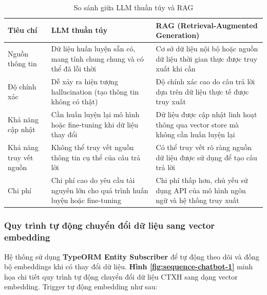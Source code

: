 \begin{table}[H]
\centering

\label{tab:compare-llm-rag}
\renewcommand{\arraystretch}{1.4}
\begin{tabular}{|p{}|p{}|p{}|}
\hline
\textbf{Tiêu chí} & \textbf{LLM thuần túy} & \textbf{RAG (Retrieval-Augmented Generation)} \\ 
\hline
Nguồn thông tin &
Dữ liệu huấn luyện sẵn có, mang tính chung chung và có thể đã lỗi thời &
Cơ sở dữ liệu nội bộ hoặc nguồn dữ liệu thời gian thực được truy xuất khi cần \\ 
\hline
Độ chính xác &
Dễ xảy ra hiện tượng hallucination (tạo thông tin không có thật) &
Độ chính xác cao do câu trả lời dựa trên dữ liệu thực tế được truy xuất \\ 
\hline
Khả năng cập nhật &
Cần huấn luyện lại mô hình hoặc fine-tuning khi dữ liệu thay đổi &
Dữ liệu được cập nhật linh hoạt thông qua vector store mà không cần huấn luyện lại \\ 
\hline
Khả năng truy vết nguồn &
Không thể truy vết nguồn thông tin cụ thể của câu trả lời &
Có thể truy vết rõ ràng nguồn dữ liệu được sử dụng để tạo câu trả lời \\ 
\hline
Chi phí &
Chi phí cao do yêu cầu tài nguyên lớn cho quá trình huấn luyện hoặc fine-tuning &
Chi phí thấp hơn, chủ yếu sử dụng API của mô hình ngôn ngữ và hệ thống truy xuất \\ 
\hline
\end{tabular}
\caption{So sánh giữa LLM thuần túy và RAG}
\end{table}

\subsubsection{Quy trình tự động chuyển đổi dữ liệu sang vector embedding}
Hệ thống sử dụng \textbf{TypeORM Entity Subscriber} để tự động theo dõi và đồng bộ embeddings khi có thay đổi dữ liệu. \textbf{Hình \ref{fig:sequence-chatbot-1}} minh họa chi tiết quy trình tự động chuyển đổi dữ liệu CTXH sang dạng vector embedding. Trigger tự động embedding như sau:

